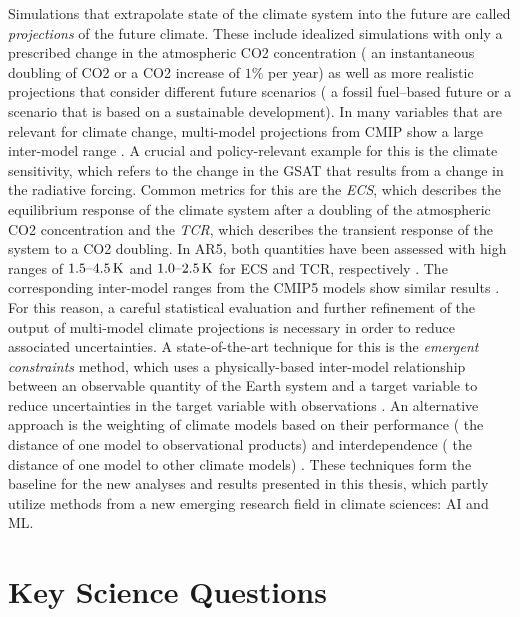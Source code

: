 Simulations that extrapolate state of the climate system into the future are
called \emph{projections} of the future climate. These include idealized
simulations with only a prescribed change in the atmospheric \ac{CO2}
concentration (\eg{} an instantaneous doubling of \ac{CO2} or a \ac{CO2}
increase of $1 \unit{\%}$ per year) as well as more realistic projections that
consider different future scenarios (\eg{} a fossil fuel--based future or a
scenario that is based on a sustainable development). In many variables that
are relevant for climate change, multi-model projections from \ac{CMIP} show a
large inter-model range \autocite{Collins2013, Flato2013}. A crucial and
policy-relevant example for this is the climate sensitivity, which refers to
the change in the \ac{GSAT} that results from a change in the radiative
forcing. Common metrics for this are the \emph{\ac{ECS}}, which describes the
equilibrium response of the climate system after a doubling of the atmospheric
\ac{CO2} concentration and the \emph{\ac{TCR}}, which describes the transient
response of the system to a \ac{CO2} doubling. In \acs{AR}5, both quantities
have been assessed with high ranges of $\rangeunit{1.5}{4.5}{K}$ and
$\rangeunit{1.0}{2.5}{K}$ for \ac{ECS} and \ac{TCR}, respectively
\autocite{Stocker2013}. The corresponding inter-model ranges from the
\acs{CMIP}5 models show similar results \autocite{Flato2013}. For this reason,
a careful statistical evaluation and further refinement of the output of
multi-model climate projections is necessary in order to reduce associated
uncertainties. A state-of-the-art technique for this is the \emph{emergent
  constraints} method, which uses a physically-based inter-model relationship
between an observable quantity of the Earth system and a target variable to
reduce uncertainties in the target variable with observations
\autocite{Allen2002}. An alternative approach is the weighting of climate
models based on their performance (\ie{} the distance of one model to
observational products) and interdependence (\ie{} the distance of one model to
other climate models) \autocite{Knutti2017a}. These techniques form the
baseline for the new analyses and results presented in this thesis, which
partly utilize methods from a new emerging research field in climate sciences:
\ac{AI} and \ac{ML}.


\section{Key Science Questions}
\label{sec:01:key_science_questions}

